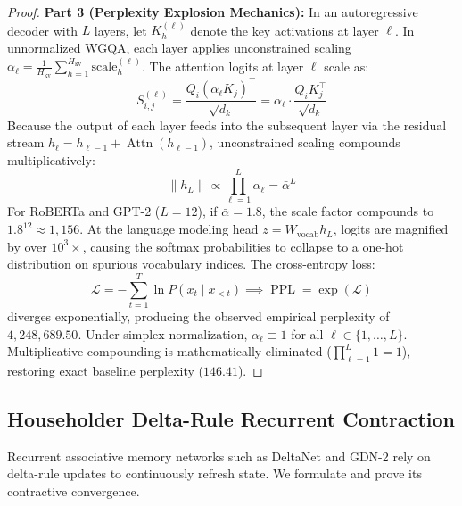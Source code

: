 \documentclass{article}
\begin{document}
\begin{proof}
\textbf{Part 3 (Perplexity Explosion Mechanics):}
In an autoregressive decoder with $L$ layers, let $K_h^{(\ell)}$ denote the key activations at layer $\ell$. In unnormalized WGQA, each layer applies unconstrained scaling $\alpha_\ell = \frac{1}{H_{\text{kv}}} \sum_{h=1}^{H_{\text{kv}}} \text{scale}_h^{(\ell)}$.
The attention logits at layer $\ell$ scale as:
\begin{equation}
    S_{i, j}^{(\ell)} = \frac{Q_i (\alpha_\ell K_j)^\top}{\sqrt{d_k}} = \alpha_\ell \cdot \frac{Q_i K_j^\top}{\sqrt{d_k}}
\end{equation}
Because the output of each layer feeds into the subsequent layer via the residual stream $h_\ell = h_{\ell-1} + \operatorname{Attn}(h_{\ell-1})$, unconstrained scaling compounds multiplicatively:
\begin{equation}
    \|h_L\| \propto \prod_{\ell=1}^L \alpha_\ell = \bar{\alpha}^L
\end{equation}
For RoBERTa and GPT-2 ($L=12$), if $\bar{\alpha} = 1.8$, the scale factor compounds to $1.8^{12} \approx 1{,}156$. At the language modeling head $z = W_{\text{vocab}} h_L$, logits are magnified by over $10^3\times$, causing the softmax probabilities to collapse to a one-hot distribution on spurious vocabulary indices. The cross-entropy loss:
\begin{equation}
    \mathcal{L} = -\sum_{t=1}^T \ln P(x_t \mid x_{<t}) \implies \operatorname{PPL} = \exp(\mathcal{L})
\end{equation}
diverges exponentially, producing the observed empirical perplexity of $4,248,689.50$.
Under simplex normalization, $\alpha_\ell \equiv 1$ for all $\ell \in \{1, \dots, L\}$. Multiplicative compounding is mathematically eliminated ($\prod_{\ell=1}^L 1 = 1$), restoring exact baseline perplexity ($146.41$).
\end{proof}

\subsection{Householder Delta-Rule Recurrent Contraction}
Recurrent associative memory networks such as DeltaNet and GDN-2 rely on delta-rule updates to continuously refresh state. We formulate and prove its contractive convergence.
\end{document}
